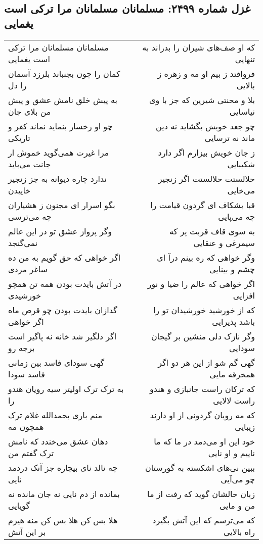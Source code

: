 \begin{center}
\section*{غزل شماره ۲۴۹۹: مسلمانان مسلمانان مرا ترکی است یغمایی}
\label{sec:2499}
\begin{longtable}{l p{0.5cm} r}
مسلمانان مسلمانان مرا ترکی است یغمایی
&&
که او صف‌های شیران را بدراند به تنهایی
\\
کمان را چون بجنباند بلرزد آسمان را دل
&&
فروافتد ز بیم او مه و زهره ز بالایی
\\
به پیش خلق نامش عشق و پیش من بلای جان
&&
بلا و محنتی شیرین که جز با وی نیاسایی
\\
چو او رخسار بنماید نماند کفر و تاریکی
&&
چو جعد خویش بگشاید نه دین ماند نه ترسایی
\\
مرا غیرت همی‌گوید خموش ار جانت می‌باید
&&
ز جان خویش بیزارم اگر دارد شکیبایی
\\
ندارد چاره دیوانه به جز زنجیر خاییدن
&&
حلالستت حلالستت اگر زنجیر می‌خایی
\\
بگو اسرار ای مجنون ز هشیاران چه می‌ترسی
&&
قبا بشکاف ای گردون قیامت را چه می‌پایی
\\
وگر پرواز عشق تو در این عالم نمی‌گنجد
&&
به سوی قاف قربت پر که سیمرغی و عنقایی
\\
اگر خواهی که حق گویم به من ده ساغر مردی
&&
وگر خواهی که ره بینم درآ ای چشم و بینایی
\\
در آتش بایدت بودن همه تن همچو خورشیدی
&&
اگر خواهی که عالم را ضیا و نور افزایی
\\
گدازان بایدت بودن چو قرص ماه اگر خواهی
&&
که از خورشید خورشیدان تو را باشد پذیرایی
\\
اگر دلگیر شد خانه نه پاگیر است برجه رو
&&
وگر نازک دلی منشین بر گیجان سودایی
\\
گهی سودای فاسد بین زمانی فاسد سودا
&&
گهی گم شو از این هر دو اگر همخرقه مایی
\\
به ترک ترک اولیتر سیه رویان هندو را
&&
که ترکان راست جانبازی و هندو راست لالایی
\\
منم باری بحمدالله غلام ترک همچون مه
&&
که مه رویان گردونی از او دارند زیبایی
\\
دهان عشق می‌خندد که نامش ترک گفتم من
&&
خود این او می‌دمد در ما که ما ناییم و او نایی
\\
چه نالد نای بیچاره جز آنک دردمد نایی
&&
ببین نی‌های اشکسته به گورستان چو می‌آیی
\\
بمانده از دم نایی نه جان مانده نه گویایی
&&
زبان حالشان گوید که رفت از ما من و مایی
\\
هلا بس کن هلا بس کن منه هیزم بر این آتش
&&
که می‌ترسم که این آتش بگیرد راه بالایی
\\
\end{longtable}
\end{center}
